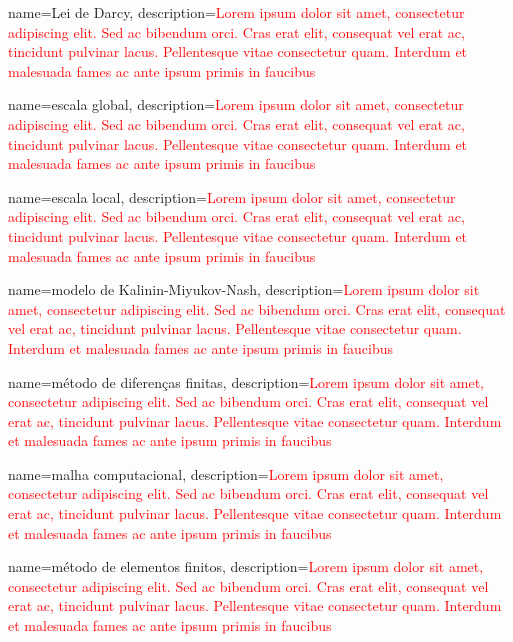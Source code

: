 {
	name=Lei de Darcy,
	description={\textcolor{red}{Lorem ipsum dolor sit amet, consectetur adipiscing elit. Sed ac bibendum orci. Cras erat elit, consequat vel erat ac, tincidunt pulvinar lacus. Pellentesque vitae consectetur quam. Interdum et malesuada fames ac ante ipsum primis in faucibus}}
}

{
	name=escala global,
	description={\textcolor{red}{Lorem ipsum dolor sit amet, consectetur adipiscing elit. Sed ac bibendum orci. Cras erat elit, consequat vel erat ac, tincidunt pulvinar lacus. Pellentesque vitae consectetur quam. Interdum et malesuada fames ac ante ipsum primis in faucibus}}
}

{
	name=escala local,
	description={\textcolor{red}{Lorem ipsum dolor sit amet, consectetur adipiscing elit. Sed ac bibendum orci. Cras erat elit, consequat vel erat ac, tincidunt pulvinar lacus. Pellentesque vitae consectetur quam. Interdum et malesuada fames ac ante ipsum primis in faucibus}}
}

{
	name=modelo de Kalinin-Miyukov-Nash,
	description={\textcolor{red}{Lorem ipsum dolor sit amet, consectetur adipiscing elit. Sed ac bibendum orci. Cras erat elit, consequat vel erat ac, tincidunt pulvinar lacus. Pellentesque vitae consectetur quam. Interdum et malesuada fames ac ante ipsum primis in faucibus}}
}

{
	name=método de diferenças finitas,
	description={\textcolor{red}{Lorem ipsum dolor sit amet, consectetur adipiscing elit. Sed ac bibendum orci. Cras erat elit, consequat vel erat ac, tincidunt pulvinar lacus. Pellentesque vitae consectetur quam. Interdum et malesuada fames ac ante ipsum primis in faucibus}}
}

{
	name=malha computacional,
	description={\textcolor{red}{Lorem ipsum dolor sit amet, consectetur adipiscing elit. Sed ac bibendum orci. Cras erat elit, consequat vel erat ac, tincidunt pulvinar lacus. Pellentesque vitae consectetur quam. Interdum et malesuada fames ac ante ipsum primis in faucibus}}
}

{
	name=método de elementos finitos,
	description={\textcolor{red}{Lorem ipsum dolor sit amet, consectetur adipiscing elit. Sed ac bibendum orci. Cras erat elit, consequat vel erat ac, tincidunt pulvinar lacus. Pellentesque vitae consectetur quam. Interdum et malesuada fames ac ante ipsum primis in faucibus}}
}

